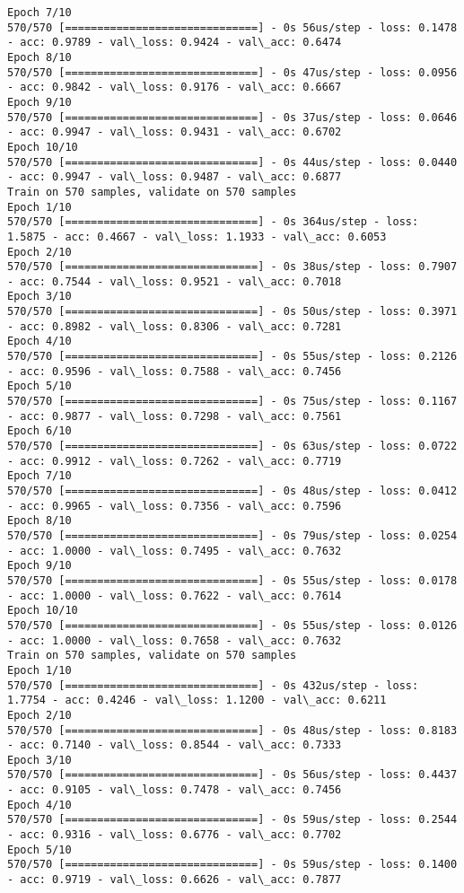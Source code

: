 \documentclass[11pt]{article}
\begin{document}
\begin{Verbatim}[commandchars=\\\{\}]
Epoch 7/10
570/570 [==============================] - 0s 56us/step - loss: 0.1478 - acc: 0.9789 - val\_loss: 0.9424 - val\_acc: 0.6474
Epoch 8/10
570/570 [==============================] - 0s 47us/step - loss: 0.0956 - acc: 0.9842 - val\_loss: 0.9176 - val\_acc: 0.6667
Epoch 9/10
570/570 [==============================] - 0s 37us/step - loss: 0.0646 - acc: 0.9947 - val\_loss: 0.9431 - val\_acc: 0.6702
Epoch 10/10
570/570 [==============================] - 0s 44us/step - loss: 0.0440 - acc: 0.9947 - val\_loss: 0.9487 - val\_acc: 0.6877
Train on 570 samples, validate on 570 samples
Epoch 1/10
570/570 [==============================] - 0s 364us/step - loss: 1.5875 - acc: 0.4667 - val\_loss: 1.1933 - val\_acc: 0.6053
Epoch 2/10
570/570 [==============================] - 0s 38us/step - loss: 0.7907 - acc: 0.7544 - val\_loss: 0.9521 - val\_acc: 0.7018
Epoch 3/10
570/570 [==============================] - 0s 50us/step - loss: 0.3971 - acc: 0.8982 - val\_loss: 0.8306 - val\_acc: 0.7281
Epoch 4/10
570/570 [==============================] - 0s 55us/step - loss: 0.2126 - acc: 0.9596 - val\_loss: 0.7588 - val\_acc: 0.7456
Epoch 5/10
570/570 [==============================] - 0s 75us/step - loss: 0.1167 - acc: 0.9877 - val\_loss: 0.7298 - val\_acc: 0.7561
Epoch 6/10
570/570 [==============================] - 0s 63us/step - loss: 0.0722 - acc: 0.9912 - val\_loss: 0.7262 - val\_acc: 0.7719
Epoch 7/10
570/570 [==============================] - 0s 48us/step - loss: 0.0412 - acc: 0.9965 - val\_loss: 0.7356 - val\_acc: 0.7596
Epoch 8/10
570/570 [==============================] - 0s 79us/step - loss: 0.0254 - acc: 1.0000 - val\_loss: 0.7495 - val\_acc: 0.7632
Epoch 9/10
570/570 [==============================] - 0s 55us/step - loss: 0.0178 - acc: 1.0000 - val\_loss: 0.7622 - val\_acc: 0.7614
Epoch 10/10
570/570 [==============================] - 0s 55us/step - loss: 0.0126 - acc: 1.0000 - val\_loss: 0.7658 - val\_acc: 0.7632
Train on 570 samples, validate on 570 samples
Epoch 1/10
570/570 [==============================] - 0s 432us/step - loss: 1.7754 - acc: 0.4246 - val\_loss: 1.1200 - val\_acc: 0.6211
Epoch 2/10
570/570 [==============================] - 0s 48us/step - loss: 0.8183 - acc: 0.7140 - val\_loss: 0.8544 - val\_acc: 0.7333
Epoch 3/10
570/570 [==============================] - 0s 56us/step - loss: 0.4437 - acc: 0.9105 - val\_loss: 0.7478 - val\_acc: 0.7456
Epoch 4/10
570/570 [==============================] - 0s 59us/step - loss: 0.2544 - acc: 0.9316 - val\_loss: 0.6776 - val\_acc: 0.7702
Epoch 5/10
570/570 [==============================] - 0s 59us/step - loss: 0.1400 - acc: 0.9719 - val\_loss: 0.6626 - val\_acc: 0.7877

\end{Verbatim}
\end{document}
